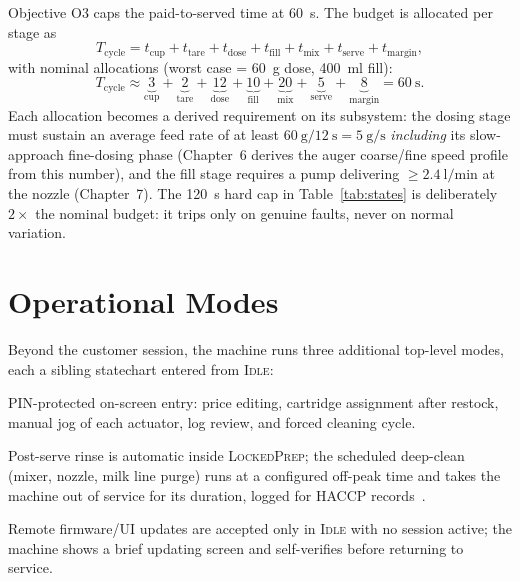 Objective O3 caps the paid-to-served time at \SI{60}{\second}. The budget
is allocated per stage as
\begin{equation}
  T_{\text{cycle}} = t_{\text{cup}} + t_{\text{tare}} + t_{\text{dose}}
                   + t_{\text{fill}} + t_{\text{mix}} + t_{\text{serve}}
                   + t_{\text{margin}},
  \label{eq:cycle}
\end{equation}
with nominal allocations (worst case = \SI{60}{\gram} dose, \SI{400}{\milli\litre} fill):
\begin{equation}
  T_{\text{cycle}} \approx
  \underbrace{3}_{\text{cup}}
  + \underbrace{2}_{\text{tare}}
  + \underbrace{12}_{\text{dose}}
  + \underbrace{10}_{\text{fill}}
  + \underbrace{20}_{\text{mix}}
  + \underbrace{5}_{\text{serve}}
  + \underbrace{8}_{\text{margin}}
  = \SI{60}{\second}.
  \label{eq:cyclebudget}
\end{equation}
Each allocation becomes a derived requirement on its subsystem: the dosing
stage must sustain an average feed rate of at least
$\SI{60}{\gram}/\SI{12}{\second} = \SI{5}{\gram\per\second}$ \emph{including}
its slow-approach fine-dosing phase (Chapter~6 derives the auger
coarse/fine speed profile from this number), and the fill stage requires a
pump delivering $\ge \SI{2.4}{\litre\per\minute}$ at the nozzle (Chapter~7).
The \SI{120}{\second} hard cap in Table~\ref{tab:states} is deliberately
$2\times$ the nominal budget: it trips only on genuine faults, never on
normal variation.

\section{Operational Modes}
\label{sec:modes}

Beyond the customer session, the machine runs three additional top-level
modes, each a sibling statechart entered from \textsc{Idle}:

\begin{description}[itemsep=2pt]
  \item[Admin mode (Chapter 2).] PIN-protected on-screen entry: price
        editing, cartridge assignment after restock, manual jog of each
        actuator, log review, and forced cleaning cycle.
  \item[Cleaning mode (Chapters 7--8, 11).] Post-serve rinse is automatic
        inside \textsc{LockedPrep}; the scheduled deep-clean (mixer, nozzle,
        milk line purge) runs at a configured off-peak time and takes the
        machine out of service for its duration, logged for HACCP
        records~\cite{codexhaccp}.
  \item[Maintenance/OTA mode (Chapter 10).] Remote firmware/UI updates are
        accepted only in \textsc{Idle} with no session active; the machine
        shows a brief updating screen and self-verifies before returning to
        service.
\end{description}

